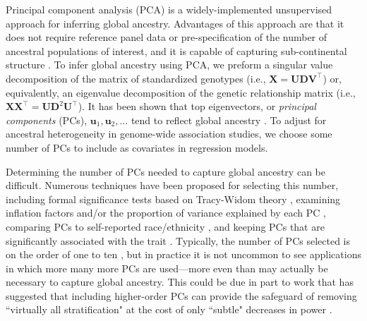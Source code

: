 \documentclass[12pt]{article}
\begin{document}
Principal component analysis (PCA) is a widely-implemented unsupervised approach for inferring global ancestry. Advantages of this approach are that it does not require reference panel data or pre-specification of the number of ancestral populations of interest, and it is capable of capturing sub-continental structure \citep{novembre2008}. 
To infer global ancestry using PCA, we preform a singular value decomposition of the matrix of standardized genotypes (i.e., $\mathbf{X} = \mathbf{U}\mathbf{D}\mathbf{V}^\top$) or, equivalently, an eigenvalue decomposition of the genetic relationship matrix (i.e., $\mathbf{X}\mathbf{X}^\top = \mathbf{U}\mathbf{D}^2\mathbf{U}^\top$).
It has been shown that top eigenvectors, or \textit{principal components} (PCs), $\mathbf{u}_1, \mathbf{u}_2, \dots$ tend to reflect global ancestry \citep{patterson2006, mcvean2009}.
To adjust for ancestral heterogeneity in genome-wide association studies, we choose some number of PCs %
to include as covariates in regression models. 

Determining the number of PCs needed to capture global ancestry can be difficult. 
Numerous techniques have been proposed for selecting this number, including formal significance tests based on Tracy-Widom theory \citep{patterson2006, eigenstrat}, examining inflation factors \citep{reed2015, conomos2016} and/or the proportion of variance explained by each PC \citep{raska2012, reed2015, conomos2016}, comparing PCs to self-reported race/ethnicity \citep{conomos2016}, and keeping PCs that are significantly associated with the trait \citep{reiner2012, daya2019}.
Typically, the number of PCs selected is on the order of one to ten \citep{abegaz2019}, but in practice it is not uncommon to see applications in which more many more PCs are used---more even than may actually be necessary to capture global ancestry. 
This could be due in part to work that has suggested that including higher-order PCs can provide the safeguard of removing ``virtually all stratification" \citep{mathieson2012} at the cost of only ``subtle" decreases in power \citep{liu2011}.
\end{document}

